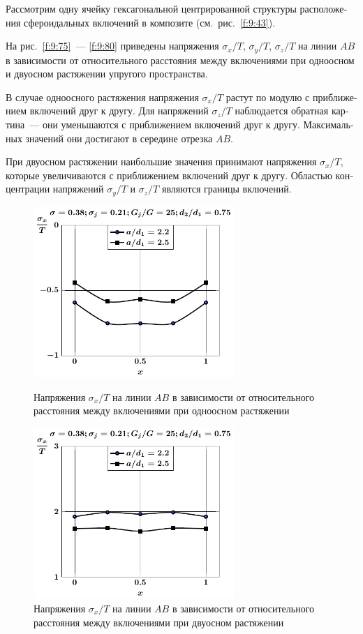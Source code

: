 \begin{russian}
Рассмотрим одну ячейку гексагональной центрированной структуры расположения сфероидальных включений в композите (см.~рис.~\ref{f:9:43}).

На рис.~\ref{f:9:75}~--- \ref{f:9:80} приведены напряжения $\sigma_x/T$, $\sigma_y/T$, $\sigma_z/T$ на линии $AB$ в зависимости от относительного расстояния между включениями при одноосном и двуосном растяжении упругого пространства.

В случае одноосного растяжения напряжения $\sigma_x/T$ растут по модулю с приближением включений друг к другу. Для напряжений $\sigma_z/T$ наблюдается обратная картина~--- они уменьшаются с приближением включений друг к другу. Максимальных значений они достигают в середине отрезка $AB$.

При двуосном растяжении наибольшие значения принимают напряжения $\sigma_x/T$, которые увеличиваются с приближением включений друг к другу. Областью концентрации напряжений $\sigma_y/T$ и $\sigma_z/T$ являются границы включений.

\begin{figure}[h!]
\centering\footnotesize
\parbox[b]{7.5cm}{\centering\includegraphics[width=7.6cm]{inc13-a-d75-g25-t1-sig_x-ab.pdf}
\caption{Напряжения $\sigma_x/T$ на линии $AB$ в зависимости от относительного расстояния между включениями при одноосном растяжении
\label{f:9:75}}}\hfil\hfil
\parbox[b]{7.5cm}{\centering\includegraphics[width=7.6cm]{inc13-a-d75-g25-t2-sig_x-ab.pdf}
\caption{Напряжения $\sigma_x/T$ на линии $AB$ в зависимости от относительного расстояния между включениями при двуосном растяжении
\label{f:9:76}}}
\end{figure}


\end{russian}
